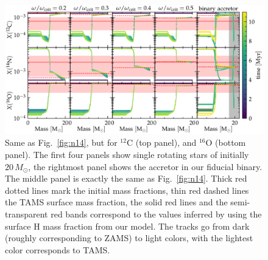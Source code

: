 \documentclass[twocolumn,twocolappendix,trackchanges]{aastex63}
\DeclareRobustCommand{\Figref}[1]{Fig.~\ref{#1}}
\begin{document}
\begin{figure}[htbp]
  \centering
  \includegraphics[width=\textwidth]{huge_composition}
  \caption{Same as \Figref{fig:n14}, but for $^{12}\mathrm{C}$ (top
    panel), and $^{16}\mathrm{O}$ (bottom panel). The first four
    panels show single rotating stars of initially $20\,M_\odot$, the
    rightmost panel shows the accretor in our fiducial binary. The middle panel is
    exactly the same as \Figref{fig:n14}. Thick red dotted lines mark the
    initial mass fractions, thin red dashed lines the TAMS surface mass
    fraction, the solid red lines and the semi-transparent red bands
    correspond to the values inferred by 
    using the surface H mass fraction from our model. The tracks go
    from dark (roughly corresponding to ZAMS) to light colors, with the
    lightest color corresponds to TAMS.}
  \label{fig:composition_huge}
\end{figure}



\end{document}
